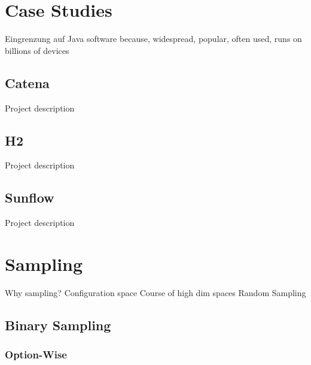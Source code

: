 \section{Case Studies}
\label{case_studies}

Eingrenzung auf Java software because, widespread, popular, often used, runs on billions of devices

% 

\subsection{Catena}

 Project description

\subsection{H2}

Project description

\subsection{Sunflow}

Project description

\section{Sampling}
\label{perf_measure_sampling}

Why sampling?
Configuration space 
Course of high dim spaces
Random Sampling

\subsection{Binary Sampling}

\subsubsection{Option-Wise}

